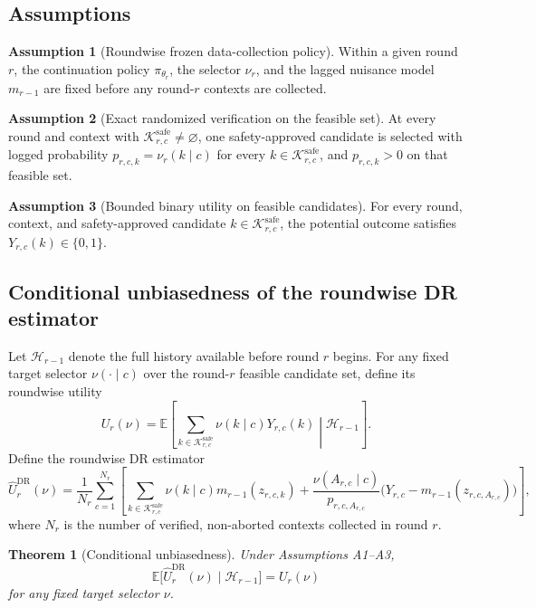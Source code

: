 \documentclass[10pt]{article}
\theoremstyle{plain}
\newtheorem{theorem}{Theorem}[section]
\theoremstyle{definition}
\newtheorem{assumption}{Assumption}
\theoremstyle{remark}
\newcommand{\E}{\mathbb{E}}
\begin{document}
\subsection{Assumptions}
\begin{assumption}[Roundwise frozen data-collection policy]
Within a given round $r$, the continuation policy $\pi_{\theta_r}$, the selector $\nu_r$, and the lagged nuisance model $m_{r-1}$ are fixed before any round-$r$ contexts are collected.
\end{assumption}

\begin{assumption}[Exact randomized verification on the feasible set]
At every round and context with $\mathcal K^{\mathrm{safe}}_{r,c}\neq\varnothing$, one safety-approved candidate is selected with logged probability $p_{r,c,k}=\nu_r(k\mid c)$ for every $k\in\mathcal K^{\mathrm{safe}}_{r,c}$, and $p_{r,c,k}>0$ on that feasible set.
\end{assumption}

\begin{assumption}[Bounded binary utility on feasible candidates]
For every round, context, and safety-approved candidate $k\in\mathcal K^{\mathrm{safe}}_{r,c}$, the potential outcome satisfies $Y_{r,c}(k)\in\{0,1\}$.
\end{assumption}

\subsection{Conditional unbiasedness of the roundwise DR estimator}
Let $\mathcal H_{r-1}$ denote the full history available before round $r$ begins. For any fixed target selector $\nu(\cdot\mid c)$ over the round-$r$ feasible candidate set, define its roundwise utility
\[
U_r(\nu)=\E\left[\sum_{k\in\mathcal K^{\mathrm{safe}}_{r,c}}\nu(k\mid c)Y_{r,c}(k)\middle|\mathcal H_{r-1}\right].
\]
Define the roundwise DR estimator
\[
\hat U^{\mathrm{DR}}_r(\nu)=\frac{1}{N_r}\sum_{c=1}^{N_r}\left[\sum_{k\in\mathcal K^{\mathrm{safe}}_{r,c}}\nu(k\mid c)m_{r-1}(z_{r,c,k})+\frac{\nu(A_{r,c}\mid c)}{p_{r,c,A_{r,c}}}\big(Y_{r,c}-m_{r-1}(z_{r,c,A_{r,c}})\big)\right],
\]
where $N_r$ is the number of verified, non-aborted contexts collected in round $r$.

\begin{theorem}[Conditional unbiasedness]\label{thm:dr}
Under Assumptions A1--A3,
\[
\E\big[\hat U^{\mathrm{DR}}_r(\nu)\mid \mathcal H_{r-1}\big]=U_r(\nu)
\]
for any fixed target selector $\nu$.
\end{theorem}
\end{document}
